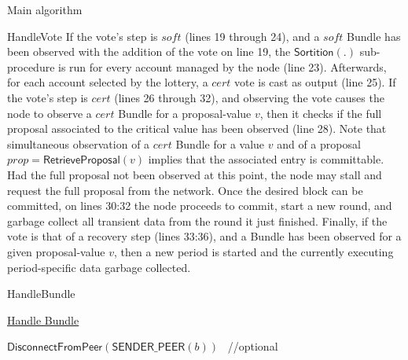 \documentclass[10pt,a4paper]{article}
\begin{document}
\begin{section}{Main algorithm}
\begin{subsection}{HandleVote}
If the vote's step is $soft$ (lines 19 through 24), and a $soft$ Bundle has been observed with the addition of the vote on line 19,
the $\mathsf{Sortition}(.)$ sub-procedure is run for every account managed by the node (line 23). Afterwards, for each account selected by
the lottery, a $cert$ vote is cast as output (line 25).
If the vote's step is $cert$ (lines 26 through 32), and observing the vote causes the node to observe a $cert$ Bundle for a proposal-value $v$,
then it checks if the full proposal associated to the critical value has been observed (line 28). Note that simultaneous observation of a $cert$ Bundle 
for a value $v$ and of a proposal $prop = \mathsf{RetrieveProposal}(v)$ implies that the associated entry is committable.
Had the full proposal not been observed at this point, the node may stall and request the full proposal from the network.
Once the desired block can be committed, on lines 30:32 the node proceeds to commit, start a new round, and garbage collect all
transient data from the round it just finished.
Finally, if the vote is that of a recovery step (lines 33:36), and a Bundle has been observed for a given proposal-value $v$,
then a new period is started and the currently executing period-specific data garbage collected.



\end{subsection}


\begin{subsection}{HandleBundle}\label{ssect:HandleBundle}

    \begin{algorithm}[H]
        \caption{\underline{Handle Bundle}}
        \label{algo:handle-bundle}
        \begin{algorithmic}[1]



                \State $\mathsf{DisconnectFromPeer}(\mathsf{SENDER\_PEER}(b))$ \ //optional
                \State \Return
            \EndIf


\end{algorithmic}
\end{algorithm}
\end{subsection}
\end{section}
\end{document}
